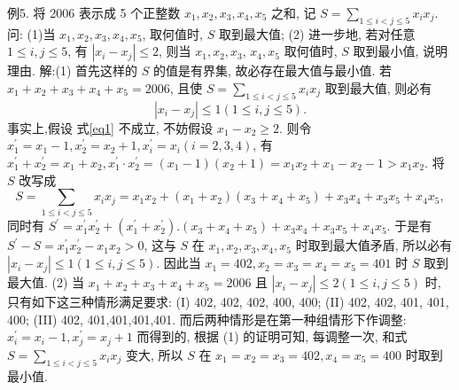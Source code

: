 例5. 将 2006 表示成 5 个正整数 $x_1, x_2, x_3, x_4, x_5$ 之和, 记 $S= \sum_{1 \leqslant i<j \leqslant 5} x_i x_j$. 问:
(1)当 $x_1, x_2, x_3, x_4, x_5$, 取何值时, $S$ 取到最大值;
(2) 进一步地, 若对任意 $1 \leqslant i, j \leqslant 5$, 有 $\left|x_i-x_j\right| \leqslant 2$, 则当 $x_1, x_2, x_3$, $x_4, x_5$ 取何值时, $S$ 取到最小值, 说明理由.
解:(1) 首先这样的 $S$ 的值是有界集, 故必存在最大值与最小值.
若 $x_1+x_2+x_3+x_4+x_5=2006$, 且使 $S=\sum_{1 \leqslant i<j \leqslant 5} x_i x_j$ 取到最大值, 则必有
$$
\left|x_i-x_j\right| \leqslant 1(1 \leqslant i, j \leqslant 5) . \label{eq1}
$$
事实上,假设 式\ref{eq1} 不成立, 不妨假设 $x_1-x_2 \geqslant 2$.
则令 $x_1^{\prime}=x_1-1, x_2^{\prime}=x_2+1, x_i^{\prime}=x_i(i=2,3,4)$, 有 $x_1^{\prime}+x_2^{\prime}=x_1+ x_2, x_1^{\prime} \cdot x_2^{\prime}=\left(x_1-1\right)\left(x_2+1\right)=x_1 x_2+x_1-x_2-1>x_1 x_2$.
将 $S$ 改写成
$$
S=\sum_{1 \leqslant i<j \leqslant 5} x_i x_j=x_1 x_2+\left(x_1+x_2\right)\left(x_3+x_4+x_5\right)+x_3 x_4+x_3 x_5+x_4 x_5,
$$
同时有 $S^{\prime}=x_1^{\prime} x_2^{\prime}+\left(x_1^{\prime}+x_2^{\prime}\right) .\left(x_3+x_4+x_5\right)+x_3 x_4+x_3 x_5+x_4 x_5$.
于是有 $S^{\prime}-S=x_1^{\prime} x_2^{\prime}-x_1 x_2>0$, 这与 $S$ 在 $x_1, x_2, x_3, x_4, x_5$ 时取到最大值矛盾, 所以必有 $\left|x_i-x_j\right| \leqslant 1(1 \leqslant i, j \leqslant 5)$. 因此当 $x_1=402, x_2= x_3=x_4=x_5=401$ 时 $S$ 取到最大值.
(2) 当 $x_1+x_2+x_3+x_4+x_5=2006$ 且 $\left|x_i-x_j\right| \leqslant 2(1 \leqslant i, j \leqslant 5)$ 时, 只有如下这三种情形满足要求:
(I) 402, 402, 402, 400, 400;
(II) 402, 402, 401, 401, 400;
(III) 402, 401,401,401,401.
而后两种情形是在第一种组情形下作调整: $x_i^{\prime}=x_i-1, x_j^{\prime}=x_j+1$ 而得到的, 根据 (1) 的证明可知, 每调整一次, 和式 $S=\sum_{1 \leqslant i<j \leqslant 5} x_i x_j$ 变大, 所以 $S$ 在 $x_1=x_2=x_3=402, x_4=x_5=400$ 时取到最小值.


